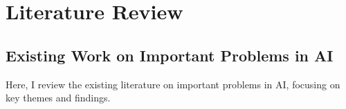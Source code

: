\chapter{Literature Review}

\section{Existing Work on Important Problems in AI}
Here, I review the existing literature on important problems in AI, focusing on key themes and findings.

